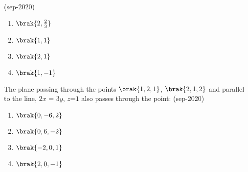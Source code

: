     \hfill(sep-2020)
    \begin{enumerate}
        \item $\brak{2,\frac{2}{3}}$
        \item $\brak{1,1}$
        \item $\brak{2,1}$
        \item $\brak{1,-1}$
    \end{enumerate}
    \item The plane passing through the points $\brak{1,2,1}$, $\brak{2,1,2}$ and parallel to the line, $2x$ = $3y$, $z$=$1$ also passes through the point:
    \hfill(sep-2020)
    \begin{enumerate}
        \item $\brak{0,-6,2}$
        \item $\brak{0,6,-2}$
        \item $\brak{-2,0,1}$
        \item $\brak{2,0,-1}$
    \end{enumerate}
    
    


